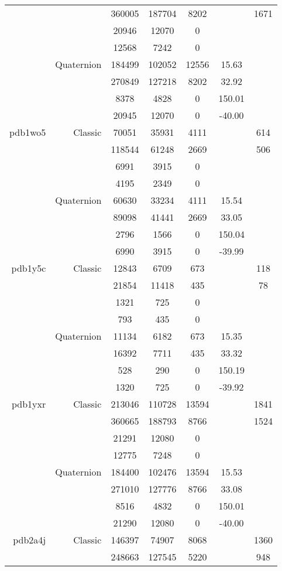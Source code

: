 \begin{xltabular}{\textwidth}{r|rcccSc}
& & 360005 & 187704 & 8202 & & 1671 \\
& & 20946 & 12070 & 0 & & \\
& & 12568 & 7242 & 0 & & \\
& Quaternion & 184499 & 102052 & 12556 & 15.63 & \\
& & 270849 & 127218 & 8202 & 32.92 & \\
& & 8378 & 4828 & 0 & 150.01 & \\
& & 20945 & 12070 & 0 & -40.00 & \\ \addlinespace
pdb1wo5 & Classic & 70051 & 35931 & 4111 & & 614 \\
& & 118544 & 61248 & 2669 & & 506 \\
& & 6991 & 3915 & 0 & & \\
& & 4195 & 2349 & 0 & & \\
& Quaternion & 60630 & 33234 & 4111 & 15.54 & \\
& & 89098 & 41441 & 2669 & 33.05 & \\
& & 2796 & 1566 & 0 & 150.04 & \\
& & 6990 & 3915 & 0 & -39.99 & \\ \addlinespace
pdb1y5c & Classic & 12843 & 6709 & 673 & & 118 \\
& & 21854 & 11418 & 435 & & 78 \\
& & 1321 & 725 & 0 & & \\
& & 793 & 435 & 0 & & \\
& Quaternion & 11134 & 6182 & 673 & 15.35 & \\
& & 16392 & 7711 & 435 & 33.32 & \\
& & 528 & 290 & 0 & 150.19 & \\
& & 1320 & 725 & 0 & -39.92 & \\ \addlinespace
pdb1yxr & Classic & 213046 & 110728 & 13594 & & 1841 \\
& & 360665 & 188793 & 8766 & & 1524 \\
& & 21291 & 12080 & 0 & & \\
& & 12775 & 7248 & 0 & & \\
& Quaternion & 184400 & 102476 & 13594 & 15.53 & \\
& & 271010 & 127776 & 8766 & 33.08 & \\
& & 8516 & 4832 & 0 & 150.01 & \\
& & 21290 & 12080 & 0 & -40.00 & \\ \addlinespace
pdb2a4j & Classic & 146397 & 74907 & 8068 & & 1360 \\
& & 248663 & 127545 & 5220 & & 948 \\

\end{xltabular}
